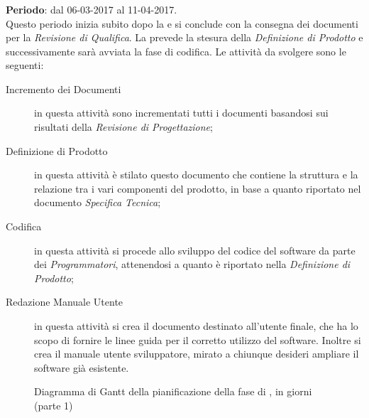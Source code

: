 	\subsubsection{\PDC} \label{sec:PDC}
	\textbf{Periodo}: dal 06-03-2017 al 11-04-2017.	
	\\ Questo periodo inizia subito dopo la \PA{} e si conclude con la consegna dei documenti per la \emph{Revisione di Qualifica}. La \PDC{} prevede la stesura della \emph{Definizione di Prodotto} e successivamente sarà avviata la fase di codifica. Le attività da svolgere sono le seguenti:
	\begin{description}
		\item[Incremento dei Documenti] in questa attività sono incrementati tutti i documenti basandosi sui risultati della \emph{Revisione di Progettazione}; 
		\item[Definizione di Prodotto] in questa attività è stilato questo documento che contiene la struttura e la relazione tra i vari componenti del prodotto, in base a quanto riportato nel documento \emph{Specifica Tecnica};
		\item[Codifica] in questa attività si procede allo sviluppo del codice del software da parte dei \emph{Programmatori}, attenendosi a quanto è riportato nella \emph{Definizione di Prodotto}; 
		\item[Redazione Manuale Utente] in questa attività si crea il documento destinato all'utente finale, che ha lo scopo di fornire le linee guida per il corretto utilizzo del software. Inoltre si crea il manuale utente sviluppatore, mirato a chiunque desideri ampliare il software già esistente.
	\end{description}
	
\begin{figure}[H]
\label{tab:ganttpa1}
\caption{Diagramma di Gantt della pianificazione della fase di \PDC, in giorni (parte 1)}
\end{figure}

